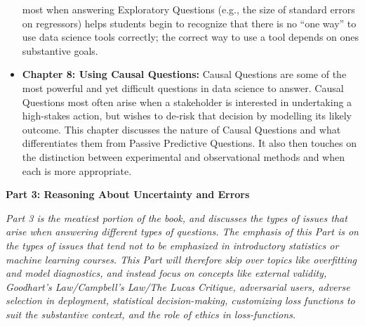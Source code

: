 \documentclass[12pt]{article}
\begin{document}
\begin{itemize}
  most when answering Exploratory Questions (e.g., the size of standard
  errors on regressors) helps students begin to recognize that there is
  no ``one way'' to use data science tools correctly; the correct way to
  use a tool depends on ones substantive goals.
\item
  \textbf{Chapter 8: Using Causal Questions:} Causal Questions are some
  of the most powerful and yet difficult questions in data science to
  answer. Causal Questions most often arise when a stakeholder is
  interested in undertaking a high-stakes action, but wishes to de-risk
  that decision by modelling its likely outcome. This chapter discusses
  the nature of Causal Questions and what differentiates them from
  Passive Predictive Questions. It also then touches on the distinction
  between experimental and observational methods and when each is more
  appropriate.
\end{itemize}

\textbf{Part 3: Reasoning About Uncertainty and Errors}

\emph{Part 3 is the meatiest portion of the book, and discusses the
types of issues that arise when answering different types of questions.
The emphasis of this Part is on the types of issues that tend not to be
emphasized in introductory statistics or machine learning courses. This
Part will therefore skip over topics like overfitting and model
diagnostics, and instead focus on concepts like external validity,
Goodhart's Law/Campbell's Law/The Lucas Critique, adversarial users,
adverse selection in deployment, statistical decision-making,
customizing loss functions to suit the substantive context, and the role
of ethics in loss-functions.}
\end{document}
